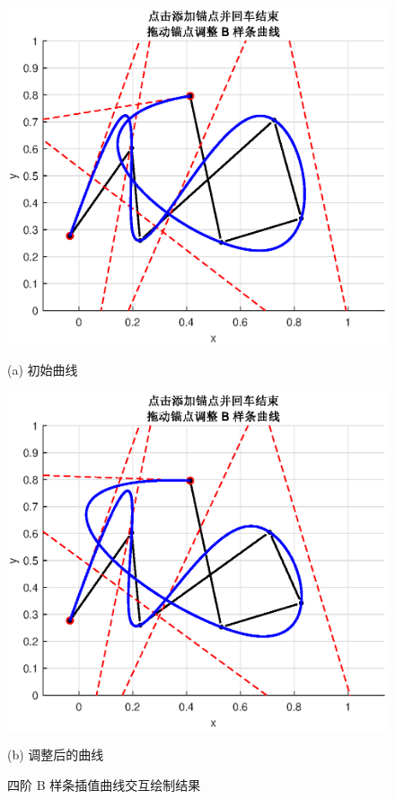 \documentclass[12pt,a4paper]{article}
\begin{document}
        \begin{figure}[ht]
            \centering
            \begin{minipage}[t]{0.48\textwidth}
                \centering
                \includegraphics[width=\textwidth]{fig/result01.eps}
                \caption*{(a) 初始曲线}
            \end{minipage}
            \hfill
            \begin{minipage}[t]{0.48\textwidth}
                \centering
                \includegraphics[width=\textwidth]{fig/result02.eps}
                \caption*{(b) 调整后的曲线}
            \end{minipage}
            \caption{四阶 B 样条插值曲线交互绘制结果}
            \label{fig:result}
        \end{figure}
\end{document}
